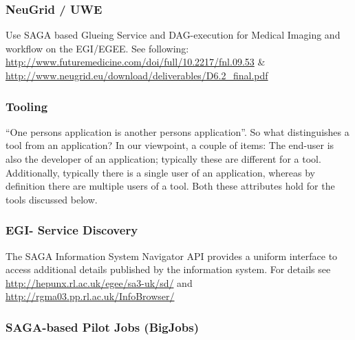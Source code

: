 \documentclass[12pt]{article}
\begin{document}
\subsubsection*{NeuGrid / UWE}
Use SAGA based Glueing Service and DAG-execution for Medical Imaging
and workflow on the EGI/EGEE.  See following:
\url{http://www.futuremedicine.com/doi/full/10.2217/fnl.09.53} \&
\url{http://www.neugrid.eu/download/deliverables/D6.2_final.pdf}

\subsubsection{Tooling}
``One persons application is another persons application''. So what
distinguishes a tool from an application?  In our viewpoint, a couple
of items: The end-user is also the developer of an application;
typically these are different for a tool. Additionally, typically
there is a single user of an application, whereas by definition there
are multiple users of a tool. Both these attributes hold for the tools
discussed below.


\subsubsection*{EGI- Service Discovery}

The SAGA Information System Navigator API provides a uniform interface
to access additional details published by the information system.  For
details see \url{http://hepunx.rl.ac.uk/egee/sa3-uk/sd/} and
\url{http://rgma03.pp.rl.ac.uk/InfoBrowser/}

\subsubsection*{SAGA-based Pilot Jobs (BigJobs)}
\end{document}
